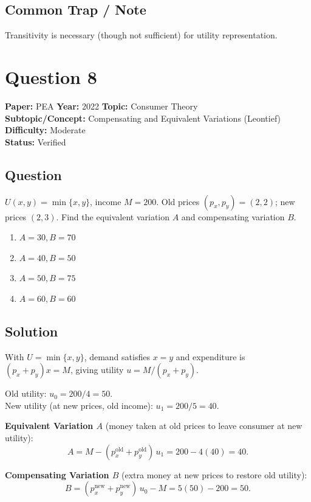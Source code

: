 \documentclass[11pt]{article}
\begin{document}
\subsection*{Common Trap / Note}
Transitivity is necessary (though not sufficient) for utility representation.

\section*{Question 8}
\textbf{Paper:} PEA \quad \textbf{Year:} 2022 \quad \textbf{Topic:} Consumer Theory \\
\textbf{Subtopic/Concept:} Compensating and Equivalent Variations (Leontief) \quad \textbf{Difficulty:} Moderate \\
\textbf{Status:} Verified

\subsection*{Question}
$U(x,y) = \min\{x,y\}$, income $M = 200$. Old prices $(p_x, p_y) = (2,2)$; new prices $(2,3)$.
Find the equivalent variation $A$ and compensating variation $B$.
\begin{enumerate}[label=(\Alph*)]
\item $A = 30, B = 70$
\item $A = 40, B = 50$
\item $A = 50, B = 75$
\item $A = 60, B = 60$
\end{enumerate}

\subsection*{Solution}
With $U = \min\{x,y\}$, demand satisfies $x = y$ and expenditure is $(p_x + p_y) x = M$,
giving utility $u = M/(p_x + p_y)$.

Old utility: $u_0 = 200/4 = 50$. \\
New utility (at new prices, old income): $u_1 = 200/5 = 40$.

\textbf{Equivalent Variation $A$} (money taken at old prices to leave consumer at new utility):
\[
A = M - (p_x^{\text{old}} + p_y^{\text{old}})\, u_1 = 200 - 4(40) = 40.
\]

\textbf{Compensating Variation $B$} (extra money at new prices to restore old utility):
\[
B = (p_x^{\text{new}} + p_y^{\text{new}})\, u_0 - M = 5(50) - 200 = 50.
\]
\end{document}
